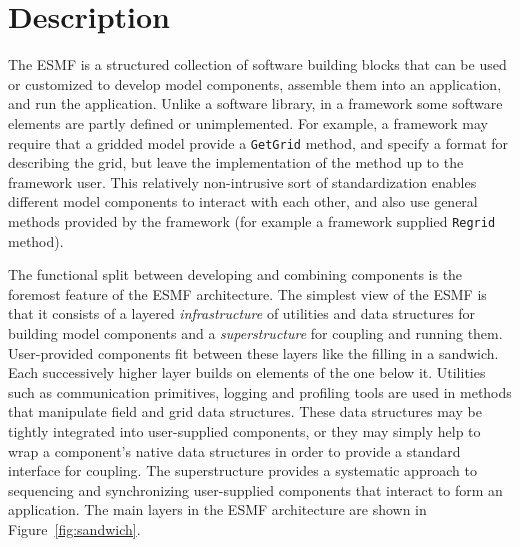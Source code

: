 
\section{Description}

The ESMF is a structured collection of software building blocks 
that can be used or customized to develop model components, assemble them into an 
application, and run the application.  Unlike a software library, in a framework some
software elements are partly defined or unimplemented.  For example, a framework
may require that a gridded model provide a {\tt GetGrid} method, and specify 
a format for describing the grid, but leave the implementation of the method up
to the framework user.  This relatively non-intrusive sort of standardization enables 
different model components to interact with each other, and also
use general methods provided by the framework (for example a framework supplied
{\tt Regrid} method).

The functional split between developing and combining components is the
foremost feature of the ESMF architecture.  The simplest view of the ESMF 
is that it consists of a layered {\it infrastructure} of utilities and data 
structures for building model components and a {\it superstructure} for coupling 
and running them.  User-provided components fit between these 
layers like the filling in a sandwich.  Each successively higher layer builds
on elements of the one below it.  Utilities such as communication
primitives, logging and profiling tools are used in methods that
manipulate field and grid data structures.  These data structures may be
tightly integrated into user-supplied components, or they may simply 
help to wrap a component's native data structures in order to provide 
a standard interface for coupling.  The superstructure provides a systematic 
approach to sequencing and synchronizing user-supplied components that 
interact to form an application.  The main layers in the ESMF architecture are 
shown in Figure~\ref{fig:sandwich}.  





































